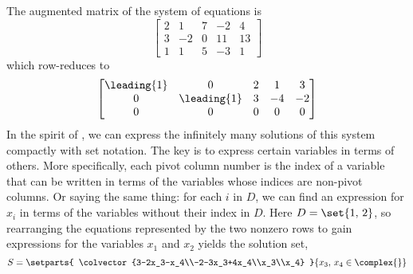 The augmented matrix of the system of equations is
%
\begin{equation*}
\begin{bmatrix}
2 & 1 & 7 & -2 & 4\\ 
3 & -2 & 0 & 11 & 13\\ 
1 & 1 & 5 & -3 & 1
\end{bmatrix}
\end{equation*}
%
which row-reduces to
%
\begin{equation*}
\begin{bmatrix}
\leading{1}& 0 & 2 & 1 & 3\\ 
0 & \leading{1} & 3 & -4 & -2\\ 
0 & 0 & 0 & 0 & 0
\end{bmatrix}
\end{equation*}
%
In the spirit of , we can express the infinitely many solutions of this system compactly with set notation.  The key is to express certain variables in terms of others.  More specifically, each pivot column number is the index of a variable that can be written in terms of the variables whose indices are non-pivot columns.  Or saying the same thing: for each $i$ in $D$, we can find an expression for $x_i$ in terms of the variables without their index in $D$.  Here $D=\set{1,\,2}$, so rearranging the equations represented by the two nonzero rows to gain expressions for the variables $x_1$ and $x_2$ yields the solution set,
%
\begin{equation*}
S=\setparts{
\colvector{3-2x_3-x_4\\-2-3x_3+4x_4\\x_3\\x_4}
}{
x_3,\,x_4\in\complex{\null}
}
\end{equation*}

